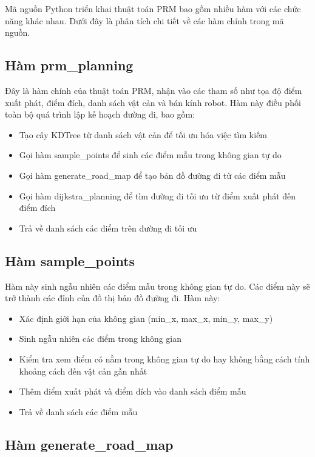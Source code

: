 \documentclass[12pt,a4paper,openany,oneside]{report}
\begin{document}
Mã nguồn Python triển khai thuật toán PRM bao gồm nhiều hàm với các chức năng khác nhau. Dưới đây là phân tích chi tiết về các hàm chính trong mã nguồn.

\subsection{Hàm prm\_planning}

Đây là hàm chính của thuật toán PRM, nhận vào các tham số như tọa độ điểm xuất phát, điểm đích, danh sách vật cản và bán kính robot. Hàm này điều phối toàn bộ quá trình lập kế hoạch đường đi, bao gồm:

\begin{itemize}
    \item Tạo cây KDTree từ danh sách vật cản để tối ưu hóa việc tìm kiếm
    \item Gọi hàm sample\_points để sinh các điểm mẫu trong không gian tự do
    \item Gọi hàm generate\_road\_map để tạo bản đồ đường đi từ các điểm mẫu
    \item Gọi hàm dijkstra\_planning để tìm đường đi tối ưu từ điểm xuất phát đến điểm đích
    \item Trả về danh sách các điểm trên đường đi tối ưu
\end{itemize}

\subsection{Hàm sample\_points}

Hàm này sinh ngẫu nhiên các điểm mẫu trong không gian tự do. Các điểm này sẽ trở thành các đỉnh của đồ thị bản đồ đường đi. Hàm này:

\begin{itemize}
    \item Xác định giới hạn của không gian (min\_x, max\_x, min\_y, max\_y)
    \item Sinh ngẫu nhiên các điểm trong không gian
    \item Kiểm tra xem điểm có nằm trong không gian tự do hay không bằng cách tính khoảng cách đến vật cản gần nhất
    \item Thêm điểm xuất phát và điểm đích vào danh sách điểm mẫu
    \item Trả về danh sách các điểm mẫu
\end{itemize}

\subsection{Hàm generate\_road\_map}
\end{document}
